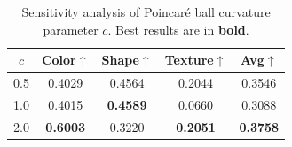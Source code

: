 \begin{table}[t]
\centering
\caption{Sensitivity analysis of Poincar\'{e} ball curvature parameter $c$. Best results are in \textbf{bold}.}
\label{tab:curvature}
\begin{tabular}{c|ccc|c}
\toprule
$c$ & Color$\uparrow$ & Shape$\uparrow$ & Texture$\uparrow$ & Avg$\uparrow$ \\
\midrule
0.5 & 0.4029 & 0.4564 & 0.2044 & 0.3546 \\
1.0 & 0.4015 & \textbf{0.4589} & 0.0660 & 0.3088 \\
2.0 & \textbf{0.6003} & 0.3220 & \textbf{0.2051} & \textbf{0.3758} \\
\bottomrule
\end{tabular}
\end{table}
